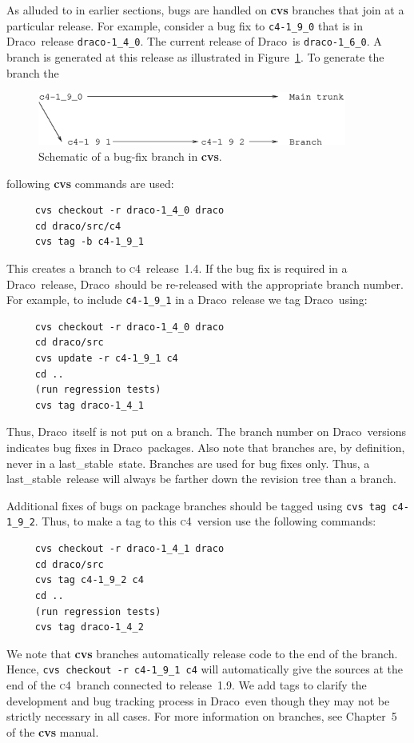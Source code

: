 \documentclass[11pt]{nmemo}
\newcommand{\draco}{{\normalfont\normalsize\sffamily Draco}}
\newcommand{\cfour}{{\normalfont\normalsize\scshape c\small 4}}
\newcommand{\stable}{{\normalfont\normalsize\ttfamily last\_stable}}
\begin{document}
As alluded to in earlier sections, bugs are handled on {\bf cvs}
branches that join at a particular release.  For example, consider a
bug fix to \texttt{c4-1\_9\_0} that is in \draco\ release
\texttt{draco-1\_4\_0}.  The current release of \draco\ is
\texttt{draco-1\_6\_0}.  A branch is generated at this release as
illustrated in Figure~\ref{fig:branch}.  To generate the branch the
\begin{figure}
  \centerline{\includegraphics[width=4in]{branch.eps}}
  \caption{Schematic of a bug-fix branch in {\bf cvs}.}
  \label{fig:branch}
\end{figure}
following {\bf cvs} commands are used:
\begin{verbatim}
     cvs checkout -r draco-1_4_0 draco
     cd draco/src/c4
     cvs tag -b c4-1_9_1
\end{verbatim}
This creates a branch to \cfour\ release~1.4.  If the bug fix is
required in a \draco\ release, \draco\ should be re-released with the
appropriate branch number.  For example, to include
\texttt{c4-1\_9\_1} in a \draco\ release we tag \draco\ using:
\begin{verbatim}
     cvs checkout -r draco-1_4_0 draco
     cd draco/src
     cvs update -r c4-1_9_1 c4
     cd ..
     (run regression tests)
     cvs tag draco-1_4_1
\end{verbatim}
Thus, \draco\ itself is not put on a branch.  The branch number on
\draco\ versions indicates bug fixes in \draco\ packages.  Also note
that branches are, by definition, never in a \stable\ state.  Branches
are used for bug fixes only.  Thus, a \stable\ release will always be
farther down the revision tree than a branch.

Additional fixes of bugs on package branches should be tagged using
\texttt{cvs tag c4-1\_9\_2}.  Thus, to make a tag to this \cfour\ 
version use the following commands:
\begin{verbatim}
     cvs checkout -r draco-1_4_1 draco
     cd draco/src
     cvs tag c4-1_9_2 c4
     cd ..
     (run regression tests)
     cvs tag draco-1_4_2
\end{verbatim}
We note that {\bf cvs} branches automatically release code to the end
of the branch.  Hence, \texttt{cvs checkout -r c4-1\_9\_1 c4} will
automatically give the sources at the end of the \cfour\ branch
connected to release~1.9.  We add tags to clarify the development and
bug tracking process in \draco\ even though they may not be strictly
necessary in all cases.  For more information on branches, see
Chapter~5 of the {\bf cvs} manual.
\end{document}

